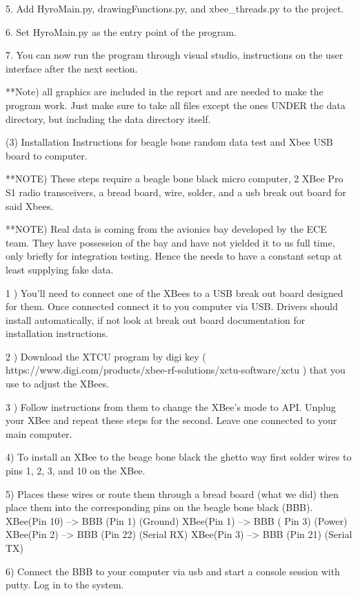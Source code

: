 \documentclass[10pt,draftclsnofoot,onecolumn,retainorgcmds]{IEEEtran}
\begin{document}
5. Add HyroMain.py, drawingFunctions.py, and xbee\_threads.py to the project.

6. Set HyroMain.py as the entry point of the program.

7. You can now run the program through visual studio, instructions on the user interface after the next section.

**Note) all graphics are included in the report and are needed to make the program work. Just make sure to take all files
except the ones UNDER the data directory, but including the data directory itself. 

(3) Installation Instructions for beagle bone random data test and Xbee USB board to computer.

**NOTE) These steps require a beagle bone black micro computer, 2 XBee Pro S1 radio transceivers, a bread board, wire, solder, and a usb break out board for said Xbees.

**NOTE) Real data is coming from the avionics bay developed by the ECE team. They have possession of the bay and have not yielded it to us full time, only briefly for integration testing.
Hence the needs to have a constant setup at least supplying fake data.

1 ) You'll need to connect one of the XBees to a USB break out board designed for them. Once connected connect it to you computer via USB. Drivers should install automatically, if not
look at break out board documentation for installation instructions. 

2 ) Download the XTCU program by digi  key ( https://www.digi.com/products/xbee-rf-solutions/xctu-software/xctu ) that you use to adjust the XBees. 

3 ) Follow instructions from them to change the XBee's mode to API. Unplug your XBee and repeat these steps for the second. Leave one connected to your main computer.

4) To install an XBee to the beage bone black the ghetto way first solder wires to pins 1, 2, 3, and 10 on the XBee.

5) Places these wires or route them through a bread board (what we did) then place them into the corresponding pins on the beagle bone black (BBB).
XBee(Pin 10) --> BBB (Pin 1) (Ground)
XBee(Pin 1) --> BBB ( Pin 3) (Power)
XBee(Pin 2) --> BBB (Pin 22) (Serial RX)
XBee(Pin 3) --> BBB (Pin 21) (Serial TX)

6) Connect the BBB to your computer via usb and start a console session with putty. Log in to the system.
\end{document}
